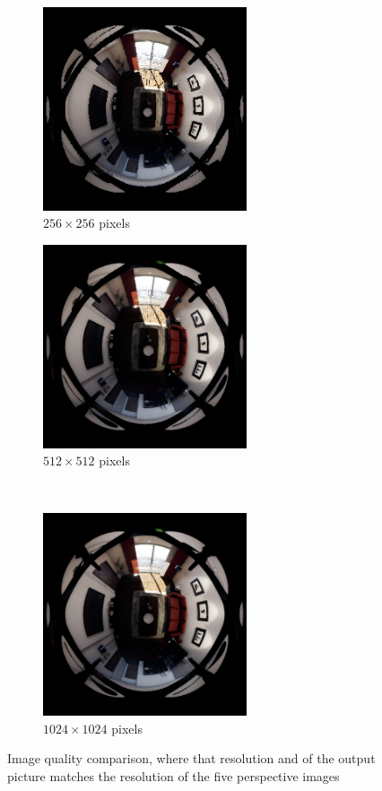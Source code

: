 \begin{figure}[!htb]
    \centering
    \begin{subfigure}{0.45\textwidth}
    \centering
        \includegraphics[height=6cm]{rapport/fig/Results/256to256.jpeg}
        \caption{$256 \times 256$ pixels}
        \label{fig:res_comp_256_to_256}
    \end{subfigure}
    \begin{subfigure}{0.45\textwidth}
        \centering
        \includegraphics[height=6cm]{rapport/fig/Results/512to512.jpeg}
        \caption{$512 \times 512$ pixels}
        \label{fig:res_comp_512_512}
    \end{subfigure} \\   
    \begin{subfigure}{0.7\textwidth}
        \centering
        \includegraphics[height=6cm]{rapport/fig/Results/1024to1024.jpeg}
        \caption{$1024 \times 1024$ pixels}
        \label{fig:res_comp_1024_1024}
    \end{subfigure}
    \centering
    \caption{Image quality comparison, where that resolution and of the output picture matches the resolution of the five perspective images}
    \label{fig:res_quality_comparison}
\end{figure}

